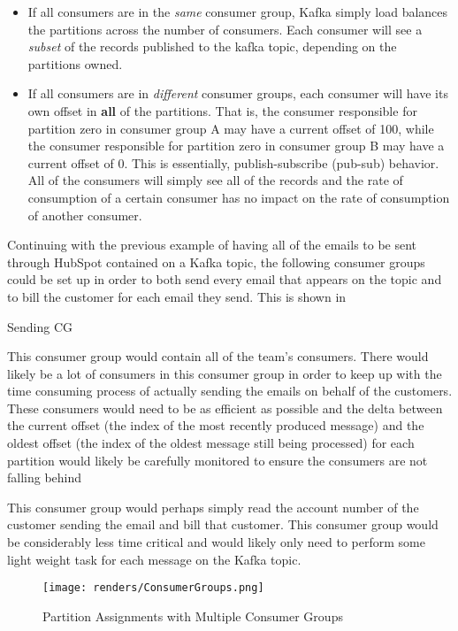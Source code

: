 \begin{itemize}
\item{If all consumers are in the \textit{same} consumer group, Kafka simply load balances the partitions across the number of consumers}. Each consumer will see a \textit{subset} of the records published to the kafka topic, depending on the partitions owned.
\item{If all consumers are in \textit{different} consumer groups, each consumer will have its own offset in \textbf{all} of the partitions. That is, the consumer responsible for partition zero in consumer group A may have a current offset of 100, while the consumer responsible for partition zero in consumer group B may have a current offset of 0. This is essentially, publish-subscribe (pub-sub) behavior. All of the consumers will simply see all of the records and the rate of consumption of a certain consumer has no impact on the rate of consumption of another consumer.}
\end{itemize}

Continuing with the previous example of having all of the emails to be sent through HubSpot contained on a Kafka topic, the following consumer groups could be set up in order to both send every email that appears on the topic and to bill the customer for each email they send. This is shown in 
\begin{labeling}{Sending CG}
\item[Sending CG]{This consumer group would contain all of the \team{} team's consumers. There would likely be a lot of consumers in this consumer group in order to keep up with the time consuming process of actually sending the emails on behalf of the customers. These consumers would need to be as efficient as possible and the delta between the current offset (the index of the most recently produced message) and the oldest offset (the index of the oldest message still being processed) for each partition would likely be carefully monitored to ensure the consumers are not falling behind}
\item[Billing CG]{This consumer group would perhaps simply read the account number of the customer sending the email and bill that customer. This consumer group would be considerably less time critical and would likely only need to perform some light weight task for each message on the Kafka topic.}
\end{labeling}


\begin{figure}[H]
      \centering
      \texttt{[image: renders/ConsumerGroups.png]}
      \caption{Partition Assignments with Multiple Consumer Groups}
      \label{fig:consumerGroups}
\end{figure}  


